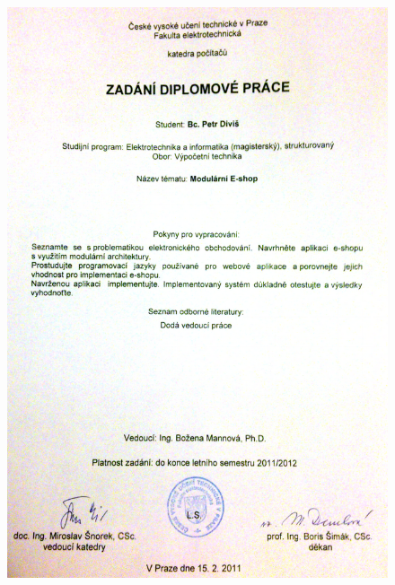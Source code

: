 \documentclass[11pt,twoside,a4paper]{book}
\begin{document}
{
 \cleardoublepage \thispagestyle{empty}
\begin{figure}
\begin{center}
\includegraphics[width=15cm]{figures/zadani.png}
\end{center}
\end{figure}
\newpage
}


\coverpagestarts

\end{document}
